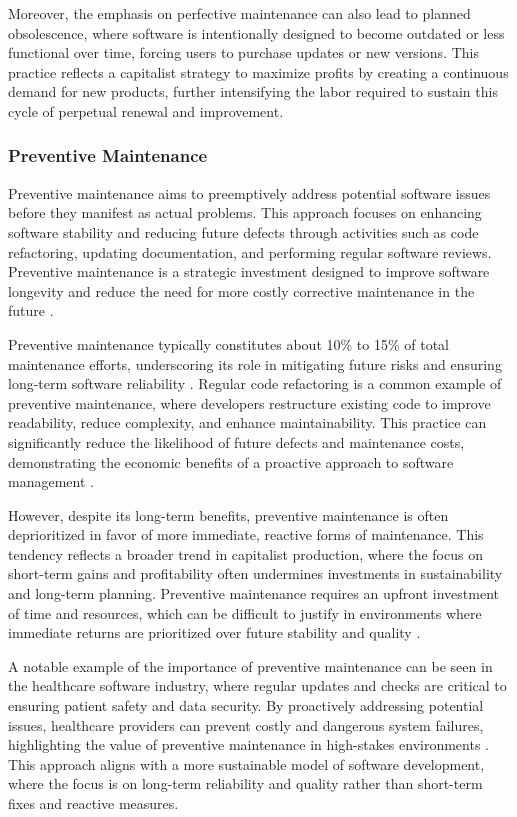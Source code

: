 \begin{refsection}
Moreover, the emphasis on perfective maintenance can also lead to planned obsolescence, where software is intentionally designed to become outdated or less functional over time, forcing users to purchase updates or new versions. This practice reflects a capitalist strategy to maximize profits by creating a continuous demand for new products, further intensifying the labor required to sustain this cycle of perpetual renewal and improvement.

\subsubsection{Preventive Maintenance}

Preventive maintenance aims to preemptively address potential software issues before they manifest as actual problems. This approach focuses on enhancing software stability and reducing future defects through activities such as code refactoring, updating documentation, and performing regular software reviews. Preventive maintenance is a strategic investment designed to improve software longevity and reduce the need for more costly corrective maintenance in the future \cite[pp.~268-270]{pigoski2008practical}.

Preventive maintenance typically constitutes about 10\% to 15\% of total maintenance efforts, underscoring its role in mitigating future risks and ensuring long-term software reliability \cite[pp.~275-278]{lientz1980characteristics}. Regular code refactoring is a common example of preventive maintenance, where developers restructure existing code to improve readability, reduce complexity, and enhance maintainability. This practice can significantly reduce the likelihood of future defects and maintenance costs, demonstrating the economic benefits of a proactive approach to software management \cite[pp.~89-90]{brooks1995mythical}.

However, despite its long-term benefits, preventive maintenance is often deprioritized in favor of more immediate, reactive forms of maintenance. This tendency reflects a broader trend in capitalist production, where the focus on short-term gains and profitability often undermines investments in sustainability and long-term planning. Preventive maintenance requires an upfront investment of time and resources, which can be difficult to justify in environments where immediate returns are prioritized over future stability and quality \cite[pp.~121-123]{pressman2019software}.

A notable example of the importance of preventive maintenance can be seen in the healthcare software industry, where regular updates and checks are critical to ensuring patient safety and data security. By proactively addressing potential issues, healthcare providers can prevent costly and dangerous system failures, highlighting the value of preventive maintenance in high-stakes environments \cite[pp.~49-51]{parnas1994software}. This approach aligns with a more sustainable model of software development, where the focus is on long-term reliability and quality rather than short-term fixes and reactive measures.


\end{refsection}
